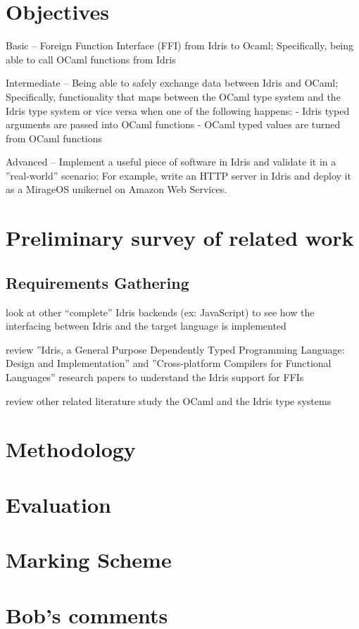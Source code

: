 \documentclass[a4paper]{report}
\begin{document}
\section{Objectives}
Basic –  Foreign Function Interface (FFI) from Idris to Ocaml; Specifically,
being able to call
OCaml functions from Idris

Intermediate – Being able to safely exchange data between Idris and OCaml;
Specifically,
functionality that maps between the OCaml type system and the Idris type system
or vice versa when
one of the following happens:
- Idris typed arguments are passed into OCaml functions
- OCaml typed values are turned from OCaml functions

Advanced – Implement a useful piece of software in Idris and validate
it in a ''real-world'' scenario;
For example, write an HTTP server in Idris and deploy it as a MirageOS
unikernel on
Amazon Web Services.

\section{Preliminary survey of related work}

\subsection{Requirements Gathering}
look at other “complete” Idris backends (ex: JavaScript) to see how the
interfacing between Idris
and the target language is implemented

review ''Idris, a General Purpose Dependently Typed Programming Language:
Design and Implementation''
and ''Cross-platform Compilers for Functional Languages'' research papers to
understand the Idris
support for FFIs

review other related literature
study the OCaml and the Idris type systems

\section{Methodology}
\section{Evaluation}
\section{Marking Scheme}
\section{Bob's comments}
\end{document}
